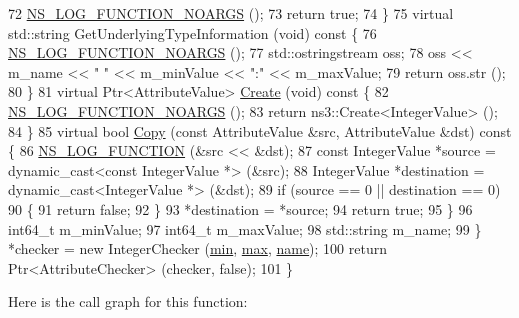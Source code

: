 \begin{DoxyCode}
72       \hyperlink{log-macros-disabled_8h_a8f7e4afc291c9d29a65c18ac1f79197b}{NS\_LOG\_FUNCTION\_NOARGS} ();
73       \textcolor{keywordflow}{return} \textcolor{keyword}{true};
74     \}
75     \textcolor{keyword}{virtual} std::string GetUnderlyingTypeInformation (\textcolor{keywordtype}{void})\textcolor{keyword}{ const }\{
76       \hyperlink{log-macros-disabled_8h_a8f7e4afc291c9d29a65c18ac1f79197b}{NS\_LOG\_FUNCTION\_NOARGS} ();
77       std::ostringstream oss;
78       oss << m\_name << \textcolor{stringliteral}{" "} << m\_minValue << \textcolor{stringliteral}{":"} << m\_maxValue;
79       \textcolor{keywordflow}{return} oss.str ();
80     \}
81     \textcolor{keyword}{virtual} Ptr<AttributeValue> \hyperlink{group__ptr_ga0406dd2d929ceac05ce39d4579fa3e4b}{Create} (\textcolor{keywordtype}{void})\textcolor{keyword}{ const }\{
82       \hyperlink{log-macros-disabled_8h_a8f7e4afc291c9d29a65c18ac1f79197b}{NS\_LOG\_FUNCTION\_NOARGS} ();
83       \textcolor{keywordflow}{return} ns3::Create<IntegerValue> ();
84     \}
85     \textcolor{keyword}{virtual} \textcolor{keywordtype}{bool} \hyperlink{namespacens3_a952d99f6d759fee74dda19f308451bc1}{Copy} (\textcolor{keyword}{const} AttributeValue &src, AttributeValue &dst)\textcolor{keyword}{ const }\{
86       \hyperlink{log-macros-disabled_8h_a90b90d5bad1f39cb1b64923ea94c0761}{NS\_LOG\_FUNCTION} (&src << &dst);
87       \textcolor{keyword}{const} IntegerValue *source = \textcolor{keyword}{dynamic\_cast<}\textcolor{keyword}{const }IntegerValue *\textcolor{keyword}{>} (&src);
88       IntegerValue *destination = \textcolor{keyword}{dynamic\_cast<}IntegerValue *\textcolor{keyword}{>} (&dst);
89       \textcolor{keywordflow}{if} (source == 0 || destination == 0)
90         \{
91           \textcolor{keywordflow}{return} \textcolor{keyword}{false};
92         \}
93       *destination = *source;
94       \textcolor{keywordflow}{return} \textcolor{keyword}{true};
95     \}
96     int64\_t m\_minValue;
97     int64\_t m\_maxValue;
98     std::string m\_name;
99   \} *checker = \textcolor{keyword}{new} IntegerChecker (\hyperlink{80211b_8c_ac6afabdc09a49a433ee19d8a9486056d}{min}, \hyperlink{80211b_8c_affe776513b24d84b39af8ab0930fef7f}{max}, \hyperlink{generate__test__data__lte__spectrum__model_8m_ab74e6bf80237ddc4109968cedc58c151}{name});
100   \textcolor{keywordflow}{return} Ptr<AttributeChecker> (checker, \textcolor{keyword}{false});
101 \}
\end{DoxyCode}


Here is the call graph for this function\+:




